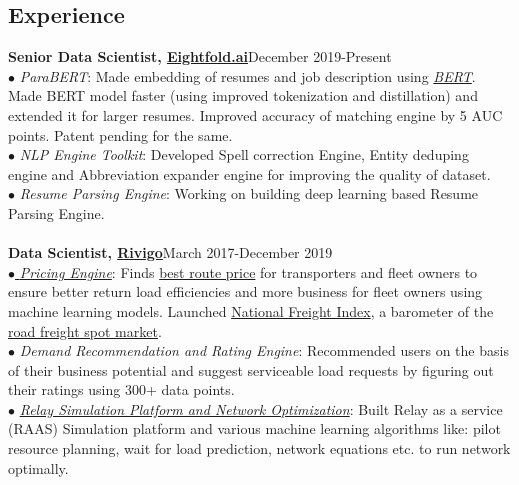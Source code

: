 \documentclass[margin,line]{resume}
\begin{document}
\begin{resume}
    \section{\mysidestyle \bf Experience}
    {\bf Senior Data Scientist, \href{https://eightfold.ai/}{Eightfold.ai}}\label{sec:\mysidestyle\bfexperience}\hfill December 2019-Present\\
      $\bullet${ \emph{ParaBERT}}: Made embedding of resumes and job description using \href{https://ai.googleblog.com/2018/11/open-sourcing-bert-state-of-art-pre.html}{\emph{BERT}}.
    Made BERT model faster (using improved tokenization and distillation) and extended it for larger resumes. Improved accuracy of matching engine by 5 AUC points. Patent pending for the same.\\
      $\bullet${ \emph{NLP Engine Toolkit}}: Developed Spell correction Engine, Entity deduping engine and Abbreviation expander engine for improving the quality of dataset.\\
      $\bullet${ \emph{Resume Parsing Engine}}: Working on building deep learning based Resume Parsing Engine.\\\\
    {\bf Data Scientist, \href{https://www.rivigo.com/}{Rivigo}}\label{sec:\mysidestyle\bfexperience}\hfill March 2017-December 2019\\
      $\bullet$\href{https://eng.rivigo.com/technology/dynamic-prediction-of-trucking-freight-prices-to-digitize-the-indian-trucking-economy/}{ \emph{ Pricing Engine}}:
    Finds \href{https://nationalfreightindex.co.in/white_paper_NFI_rivigo/}{best route price} for transporters and fleet owners to ensure better return load efficiencies and more business for fleet owners using machine learning models.
    Launched \href{https://nationalfreightindex.co.in/}{National Freight Index}, a barometer of the \href{https://www.livemint.com/companies/start-ups/start-up-rivigo-launches-national-freight-index-for-live-freight-rates-1561024666752.html}{road freight spot market}.\\
  $\bullet$ \emph{Demand Recommendation and Rating Engine}:
  Recommended users on the basis of their business potential and suggest serviceable load requests by figuring out their ratings using 300+ data points. \\
 $\bullet$ \href{https://patents.google.com/patent/US20180086348A1}{\emph{Relay Simulation Platform and Network Optimization}}:
  Built Relay as a service (RAAS) Simulation platform and various machine learning algorithms like: pilot resource planning, wait for load \linebreak prediction, network equations etc. to run network optimally.\\\\

\end{resume}
\end{document}
